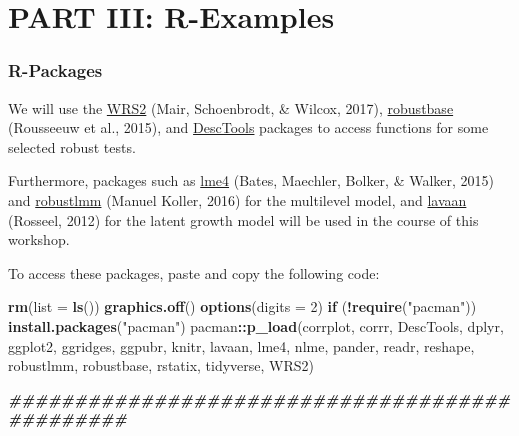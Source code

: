 \documentclass[
]{article}
\newenvironment{Shaded}{\begin{snugshade}}{\end{snugshade}}
\newcommand{\AttributeTok}[1]{\textcolor[rgb]{0.13,0.29,0.53}{#1}}
\newcommand{\ControlFlowTok}[1]{\textcolor[rgb]{0.13,0.29,0.53}{\textbf{#1}}}
\newcommand{\DecValTok}[1]{\textcolor[rgb]{0.00,0.00,0.81}{#1}}
\newcommand{\DocumentationTok}[1]{\textcolor[rgb]{0.56,0.35,0.01}{\textbf{\textit{#1}}}}
\newcommand{\FunctionTok}[1]{\textcolor[rgb]{0.13,0.29,0.53}{\textbf{#1}}}
\newcommand{\NormalTok}[1]{#1}
\newcommand{\SpecialCharTok}[1]{\textcolor[rgb]{0.81,0.36,0.00}{\textbf{#1}}}
\newcommand{\StringTok}[1]{\textcolor[rgb]{0.31,0.60,0.02}{#1}}
\begin{document}
\part*{PART III: R-Examples}\label{part-part-iii-r-examples}

\section*{R-Packages}\label{r-packages}

We will use the \href{https://cran.r-project.org/web/packages/WRS2/WRS2.pdf}{WRS2} (Mair, Schoenbrodt, \& Wilcox, 2017), \href{https://cran.r-project.org/web/packages/robustbase/robustbase.pdf}{robustbase} (Rousseeuw et al., 2015), and \href{https://cran.r-project.org/web/packages/DescTools/DescTools.pdf}{DescTools} packages to access functions for some selected robust tests.

Furthermore, packages such as \href{https://cran.r-project.org/web/packages/lme4/lme4.pdf}{lme4} (Bates, Maechler, Bolker, \& Walker, 2015) and \href{https://cran.r-project.org/web/packages/robustlmm/robustlmm.pdf}{robustlmm} (Manuel Koller, 2016) for the multilevel model, and \href{https://cran.r-project.org/web/packages/lavaan/lavaan.pdf}{lavaan} (Rosseel, 2012) for the latent growth model will be used in the course of this workshop.

To access these packages, paste and copy the following code:

\begin{Shaded}
\begin{Highlighting}[]
  \FunctionTok{rm}\NormalTok{(}\AttributeTok{list =} \FunctionTok{ls}\NormalTok{())}
  \FunctionTok{graphics.off}\NormalTok{()}
  \FunctionTok{options}\NormalTok{(}\AttributeTok{digits =} \DecValTok{2}\NormalTok{)}
  \ControlFlowTok{if}\NormalTok{ (}\SpecialCharTok{!}\FunctionTok{require}\NormalTok{(}\StringTok{"pacman"}\NormalTok{)) }\FunctionTok{install.packages}\NormalTok{(}\StringTok{"pacman"}\NormalTok{)}
\NormalTok{  pacman}\SpecialCharTok{::}\FunctionTok{p\_load}\NormalTok{(corrplot, corrr,}
\NormalTok{                 DescTools, dplyr,}
\NormalTok{                 ggplot2, ggridges, ggpubr,}
\NormalTok{                 knitr,}
\NormalTok{                 lavaan, lme4, }
\NormalTok{                 nlme, }
\NormalTok{                 pander,}
\NormalTok{                 readr, reshape, robustlmm, robustbase, rstatix,}
\NormalTok{                 tidyverse,}
\NormalTok{                 WRS2)}
  
    \DocumentationTok{\#\#\#\#\#\#\#\#\#\#\#\#\#\#\#\#\#\#\#\#\#\#\#\#\#\#\#\#\#\#\#\#\#\#\#\#\#\#\#\#\#\#\#\#\#\#\#}
\end{Highlighting}
\end{Shaded}
\end{document}
